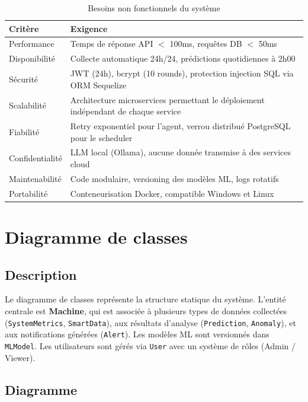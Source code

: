\begin{table}[H]
\centering
\caption{Besoins non fonctionnels du système}
\begin{tabularx}{\textwidth}{|l|X|}
\hline
\rowcolor{lightblue}
\textbf{Critère} & \textbf{Exigence} \\
\hline
Performance & Temps de réponse API $<$ 100ms, requêtes DB $<$ 50ms \\
\hline
Disponibilité & Collecte automatique 24h/24, prédictions quotidiennes à 2h00 \\
\hline
Sécurité & JWT (24h), bcrypt (10 rounds), protection injection SQL via ORM Sequelize \\
\hline
Scalabilité & Architecture microservices permettant le déploiement indépendant de chaque service \\
\hline
Fiabilité & Retry exponentiel pour l'agent, verrou distribué PostgreSQL pour le scheduler \\
\hline
Confidentialité & LLM local (Ollama), aucune donnée transmise à des services cloud \\
\hline
Maintenabilité & Code modulaire, versioning des modèles ML, logs rotatifs \\
\hline
Portabilité & Conteneurisation Docker, compatible Windows et Linux \\
\hline
\end{tabularx}
\end{table}

\section{Diagramme de classes}

\subsection{Description}

Le diagramme de classes représente la structure statique du système. L'entité centrale
est \textbf{Machine}, qui est associée à plusieurs types de données collectées
(\texttt{SystemMetrics}, \texttt{SmartData}), aux résultats d'analyse (\texttt{Prediction},
\texttt{Anomaly}), et aux notifications générées (\texttt{Alert}). Les modèles ML sont
versionnés dans \texttt{MLModel}. Les utilisateurs sont gérés via \texttt{User} avec un
système de rôles (Admin / Viewer).

\subsection{Diagramme}

